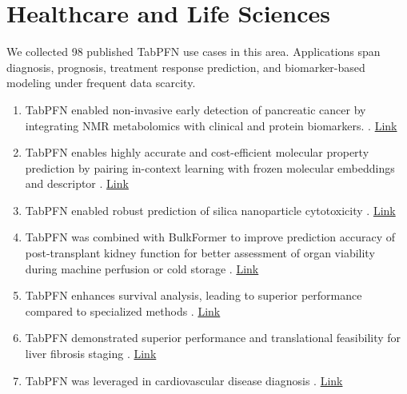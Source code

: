 \section*{Healthcare and Life Sciences}

We collected 98 published TabPFN use cases in this area. Applications span diagnosis, prognosis, treatment response prediction, and biomarker-based modeling under frequent data scarcity.

\begin{enumerate}

\item TabPFN enabled non-invasive early detection of pancreatic cancer by integrating NMR metabolomics with clinical and protein biomarkers. \cite{wu2026panmetai}. \href{https://www.nature.com/articles/s41467-026-69426-9}{Link}

\item TabPFN enables highly accurate and cost-efficient molecular property prediction by pairing in-context learning with frozen molecular embeddings and descriptor \cite{hicham2026tabularfoundationmodelsincontext}. 
\href{https://arxiv.org/abs/2604.16123}{Link}

\item TabPFN enabled robust prediction of silica nanoparticle cytotoxicity \cite{zhang2025boosting}. \href{https://www.nature.com/articles/s41598-025-33872-0}{Link}

\item TabPFN was combined with BulkFormer to improve prediction accuracy of post-transplant kidney function for better assessment of organ viability during machine perfusion or cold storage \cite{tingle2026combining}. \href{https://doi.org/10.21203/rs.3.rs-9242336/v1}{Link}

\item TabPFN enhances survival analysis, leading to superior performance compared to specialized methods \cite{seletkov2026survivalincontextpriorfittedincontext}. \href{https://arxiv.org/pdf/2603.29475}{Link}

\item TabPFN demonstrated superior performance and translational feasibility for liver fibrosis staging \cite{CHEN2026102726}. \href{https://www.cell.com/cell-reports-medicine/fulltext/S2666-3791(26)00143-6}{Link}

\item TabPFN was leveraged in cardiovascular disease diagnosis \cite{hasan2026advancing}. \href{https://doi.org/10.1038/s41598-026-35451-3}{Link}


\end{enumerate}
